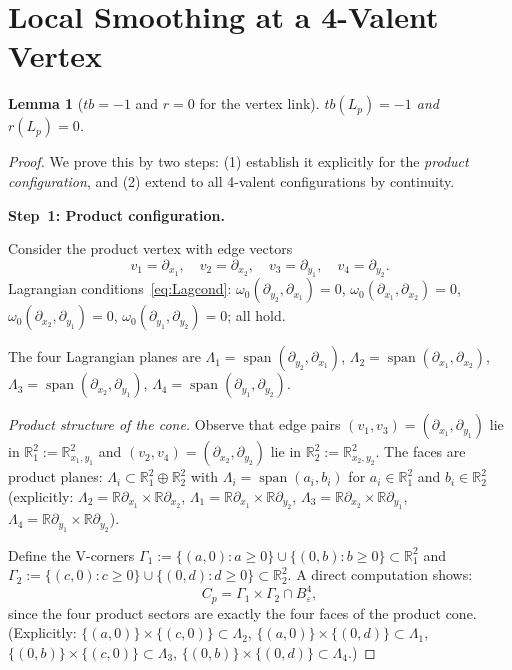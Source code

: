 \documentclass[12pt]{article}
\newtheorem{lemma}[theorem]{Lemma}
\theoremstyle{definition}
\newcommand{\R}{\mathbb{R}}
\newcommand{\La}{\Lambda}
\newcommand{\om}{\omega}
\newcommand{\eps}{\varepsilon}
\begin{document}
\section{Local Smoothing at a 4-Valent Vertex}\label{sec:local}

\begin{lemma}[$tb=-1$ and $r=0$ for the vertex link]\label{lem:tb}
$tb(L_p)=-1$ and $r(L_p)=0$.
\end{lemma}

\begin{proof}
We prove this by two steps: (1) establish it explicitly for the
\emph{product configuration}, and (2) extend to all 4-valent
configurations by continuity.

\medskip\noindent
\textbf{Step~1: Product configuration.}

Consider the product vertex with edge vectors
\begin{equation}\label{eq:prodverts}
  v_1=\partial_{x_1},\quad
  v_2=\partial_{x_2},\quad
  v_3=\partial_{y_1},\quad
  v_4=\partial_{y_2}.
\end{equation}
Lagrangian conditions~\eqref{eq:Lagcond}: $\om_0(\partial_{y_2},\partial_{x_1})=0$,
$\om_0(\partial_{x_1},\partial_{x_2})=0$, $\om_0(\partial_{x_2},\partial_{y_1})=0$,
$\om_0(\partial_{y_1},\partial_{y_2})=0$; all hold.

The four Lagrangian planes are $\La_1=\operatorname{span}(\partial_{y_2},\partial_{x_1})$,
$\La_2=\operatorname{span}(\partial_{x_1},\partial_{x_2})$,
$\La_3=\operatorname{span}(\partial_{x_2},\partial_{y_1})$,
$\La_4=\operatorname{span}(\partial_{y_1},\partial_{y_2})$.

\emph{Product structure of the cone.}
Observe that edge pairs $(v_1,v_3)=(\partial_{x_1},\partial_{y_1})$ lie in
$\R^2_1:=\R^2_{x_1,y_1}$ and $(v_2,v_4)=(\partial_{x_2},\partial_{y_2})$
lie in $\R^2_2:=\R^2_{x_2,y_2}$.  The faces are product planes:
$\La_i\subset\R^2_1\oplus\R^2_2$ with $\La_i=\operatorname{span}(a_i,b_i)$
for $a_i\in\R^2_1$ and $b_i\in\R^2_2$ (explicitly: $\La_2=\R\partial_{x_1}
\times\R\partial_{x_2}$, $\La_1=\R\partial_{x_1}\times\R\partial_{y_2}$,
$\La_3=\R\partial_{x_2}\times\R\partial_{y_1}$,
$\La_4=\R\partial_{y_1}\times\R\partial_{y_2}$).

Define the V-corners
$\Gamma_1:=\{(a,0):a\ge0\}\cup\{(0,b):b\ge0\}\subset\R^2_1$
and $\Gamma_2:=\{(c,0):c\ge0\}\cup\{(0,d):d\ge0\}\subset\R^2_2$.
A direct computation shows:
\begin{equation}\label{eq:product_cone}
  C_p = \Gamma_1\times\Gamma_2 \cap B^4_\eps,
\end{equation}
since the four product sectors are exactly the four faces
of the product cone.
(Explicitly: $\{(a,0)\}\times\{(c,0)\}\subset\La_2$,
$\{(a,0)\}\times\{(0,d)\}\subset\La_1$,
$\{(0,b)\}\times\{(c,0)\}\subset\La_3$,
$\{(0,b)\}\times\{(0,d)\}\subset\La_4$.)


\end{proof}
\end{document}

